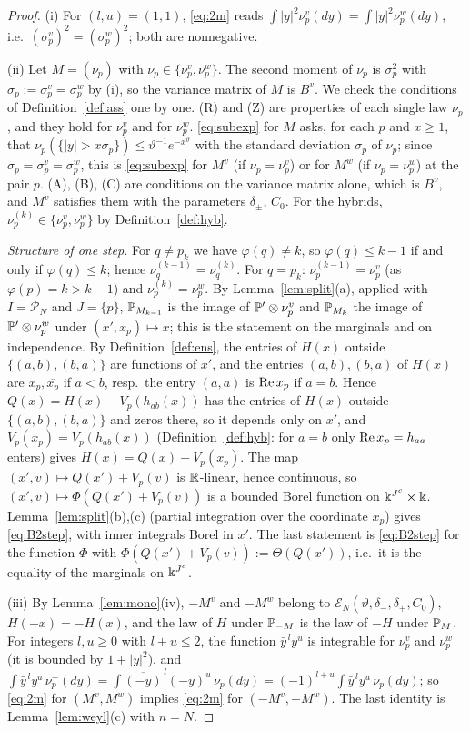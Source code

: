 \begin{proof}
(i) For $(l,u)=(1,1)$, \eqref{eq:2m} reads $\int|y|^2\nu^v_p(dy)=\int|y|^2\nu^w_p(dy)$, i.e.\ $(\sigma^v_p)^2=(\sigma^w_p)^2$; both are nonnegative.

(ii) Let $M=(\nu_p)$ with $\nu_p\in\{\nu^v_p,\nu^w_p\}$. The second moment of $\nu_p$ is $\sigma_p^2$ with $\sigma_p:=\sigma^v_p=\sigma^w_p$ by (i), so the variance matrix of $M$ is $B^v$.
We check the conditions of Definition~\ref{def:ass} one by one.
(R) and (Z) are properties of each single law $\nu_p$, and they hold for $\nu^v_p$ and for $\nu^w_p$.
\eqref{eq:subexp} for $M$ asks, for each $p$ and $x\ge1$, that $\nu_p(\{|y|>x\sigma_p\})\le\vartheta^{-1}e^{-x^\vartheta}$ with the standard deviation $\sigma_p$ of $\nu_p$;
since $\sigma_p=\sigma^v_p=\sigma^w_p$, this is \eqref{eq:subexp} for $M^v$ (if $\nu_p=\nu^v_p$) or for $M^w$ (if $\nu_p=\nu^w_p$) at the pair $p$.
(A), (B), (C) are conditions on the variance matrix alone, which is $B^v$, and $M^v$ satisfies them with the parameters $\delta_\pm$, $C_0$.
For the hybrids, $\nu^{(k)}_p\in\{\nu^v_p,\nu^w_p\}$ by Definition~\ref{def:hyb}.

\emph{Structure of one step.} For $q\ne p_k$ we have $\varphi(q)\ne k$, so $\varphi(q)\le k-1$ if and only if $\varphi(q)\le k$; hence $\nu^{(k-1)}_q=\nu^{(k)}_q$. For $q=p_k$:
$\nu^{(k-1)}_{p}=\nu^v_{p}$ (as $\varphi(p)=k>k-1$) and $\nu^{(k)}_{p}=\nu^w_{p}$. By Lemma~\ref{lem:split}(a), applied with $I=\mathcal P_N$ and $J=\{p\}$,
$\P_{M_{k-1}}$ is the image of $\P'\otimes\nu^v_p$ and $\P_{M_k}$ the image of $\P'\otimes\nu^w_p$ under $(x',x_p)\mapsto x$; this is the statement on the
marginals and on independence. By Definition~\ref{def:ens}, the entries of $H(x)$ outside $\{(a,b),(b,a)\}$ are functions of $x'$, and the entries
$(a,b),(b,a)$ of $H(x)$ are $x_p,\overline{x_p}$ if $a<b$, resp.\ the entry $(a,a)$ is $\re x_p$ if $a=b$. Hence $Q(x)=H(x)-V_p(h_{ab}(x))$ has the entries of $H(x)$
outside $\{(a,b),(b,a)\}$ and zeros there, so it depends only on $x'$, and $V_p(x_p)=V_p(h_{ab}(x))$ (Definition~\ref{def:hyb}: for $a=b$ only $\re x_p=h_{aa}$ enters)
gives $H(x)=Q(x)+V_p(x_p)$. The map $(x',v)\mapsto Q(x')+V_p(v)$ is $\R$-linear, hence continuous, so $(x',v)\mapsto\Phi(Q(x')+V_p(v))$ is a bounded Borel function on
$\K^{J^c}\times\K$. Lemma~\ref{lem:split}(b),(c) (partial integration over the coordinate $x_p$) gives \eqref{eq:B2step}, with inner integrals Borel in $x'$.
The last statement is \eqref{eq:B2step} for the function $\Phi$ with $\Phi(Q(x')+V_p(v)):=\Theta(Q(x'))$, i.e.\ it is the equality of the marginals on $\K^{J^c}$.

(iii) By Lemma~\ref{lem:mono}(iv), $-M^v$ and $-M^w$ belong to $\mathcal E_N(\vartheta,\delta_-,\delta_+,C_0)$, $H(-x)=-H(x)$, and the law of $H$ under $\P_{-M}$ is the
law of $-H$ under $\P_M$. For integers $l,u\ge0$ with $l+u\le2$, the function $\bar y^{\,l}y^u$ is integrable for $\nu^v_p$ and $\nu^w_p$ (it is bounded by $1+|y|^2$),
and $\int\bar y^{\,l}y^u\,\nu^-_p(dy)=\int\overline{(-y)}^{\,l}(-y)^u\,\nu_p(dy)=(-1)^{l+u}\int\bar y^{\,l}y^u\,\nu_p(dy)$; so \eqref{eq:2m} for $(M^v,M^w)$ implies
\eqref{eq:2m} for $(-M^v,-M^w)$. The last identity is Lemma~\ref{lem:weyl}(c) with $n=N$.
\end{proof}

